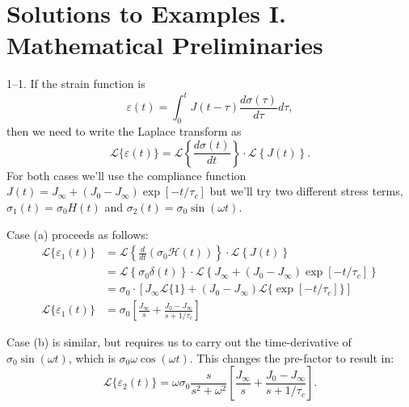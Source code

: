 \setcounter{section}{1} 
\section*{Solutions to Examples I. Mathematical Preliminaries}
\label{soln-PS1}

1--1. If the strain function is
\begin{equation*}
    \varepsilon(t) = \int_0^t J(t-\tau) \frac{d\sigma(\tau)}{d\tau} d\tau,
\end{equation*}
then we need to write the Laplace transform as 
\begin{equation*}
    \mathcal{L}\{ \varepsilon(t) \} = \mathcal{L} \left\{ \frac{d\sigma(t)}{dt} \right\} \cdot \mathcal{L}\left\{ J(t)\right\}.
\end{equation*}
For both cases we'll use the compliance function $J(t) = J_\infty + (J_0-J_\infty)\exp[-t/\tau_c]$ but we'll try two different stress terms, $\sigma_1(t) = \sigma_0 H(t)$ and $\sigma_2(t) = \sigma_0  \sin(\omega t)$. 

Case (a) proceeds as follows:
\begin{align*}
    \mathcal{L}\{ \varepsilon_1(t) \} &= \mathcal{L}\left\{ \frac{d}{dt}\left(\sigma_0 \mathcal{H}(t)\right) \right\} \cdot \mathcal{L}\left\{ J(t) \right\}\\
        &= \mathcal{L}\left\{\sigma_0 \delta(t) \right\} \cdot \mathcal{L}\left\{ J_\infty + (J_0-J_\infty)\exp[-t/\tau_c] \right\}\\
        &= \sigma_0 \cdot \left[ J_\infty \mathcal{L}\{ 1\} + (J_0 - J_\infty)\mathcal{L}\{\exp[-t/\tau_c] \}\right] \\
    \mathcal{L}\{ \varepsilon_1(t) \} &= \sigma_0 \left[ \frac{J_\infty}{s} + \frac{J_0 - J_\infty}{s+1/\tau_c} \right] 
\end{align*}

Case (b) is similar, but requires us to carry out the time-derivative of $\sigma_0 \sin(\omega t)$, which is $\sigma_0 \omega\cos(\omega t)$. 
This changes the pre-factor to result in:
\begin{equation*}
     \mathcal{L}\{ \varepsilon_2(t) \} = \omega \sigma_0 \frac{s}{s^2+\omega^2} \left[ \frac{J_\infty}{s} + \frac{J_0 - J_\infty}{s+1/\tau_c} \right].
\end{equation*}

